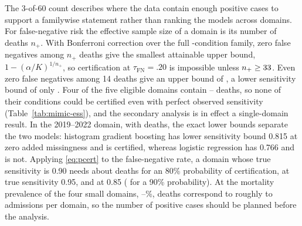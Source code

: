 \documentclass[twoside,11pt]{article}
\begin{document}
The 3-of-60 count describes where the data contain enough positive cases to support a
familywise statement rather than ranking the models across domains. For false-negative risk
the effective sample size of a domain is its number of deaths $n_+$. With Bonferroni
correction over the full \EssK-condition family, zero false negatives among $n_+$ deaths give
the smallest attainable upper bound, $1-(\alpha/K)^{1/n_+}$, so certification at
$\tau_{\mathrm{FN}}=.20$ is impossible unless $n_+\geq33$. Even zero false
negatives among 14 deaths give an upper bound of \EssZeroFNUpperFourteen, a lower sensitivity
bound of only \EssBestLowerFourteen. Four of the five eligible domains contain
\EssSmallDeathsMin--\EssSmallDeathsMax{} deaths, so none of their conditions could be certified
even with perfect observed sensitivity (Table~\ref{tab:mimic-ess}), and the secondary
analysis is in effect a single-domain result. In the 2019--2022 domain, with \EssLargeDeaths{}
deaths, the exact lower bounds separate the two models: histogram gradient boosting has lower
sensitivity bound 0.815 at zero added missingness and is certified, whereas logistic regression
has 0.766 and is not. Applying \eqref{eq:pcert} to the false-negative rate, a domain whose true
sensitivity is 0.90 needs about \EssDeathsNinety{} deaths for an 80\% probability of
certification, \EssDeathsNinetyFive{} at true sensitivity 0.95, and \EssDeathsEightyFive{} at
0.85 (\EssDeathsEightyFiveNinety{} for a 90\% probability). At the mortality prevalence of the
four small domains, \EssPrevLo--\EssPrevHi\%, \EssDeathsNinety{} deaths correspond to roughly
\EssAdmissionsLo{} to \EssAdmissionsHi{} admissions per domain, so the number of positive cases
should be planned before the analysis.
\end{document}

